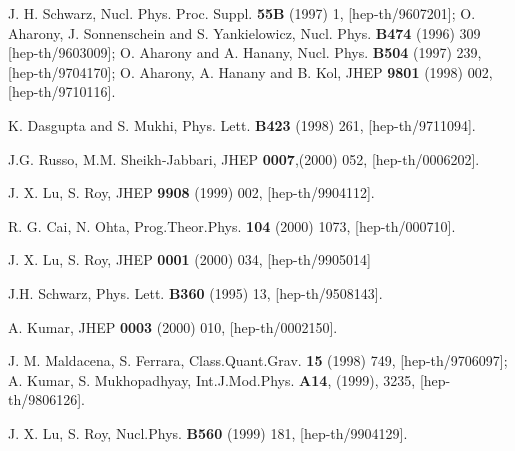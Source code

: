 \documentclass[a4paper,12pt]{article}
\begin{document}
\begin{thebibliography}{99}
 J. H. Schwarz, Nucl. Phys. Proc. Suppl. {\bf 55B} (1997)
1, [hep-th/9607201]; O. Aharony, J. Sonnenschein and S. Yankielowicz, 
Nucl. Phys. {\bf B474} (1996) 309 [hep-th/9603009]; 
O. Aharony and A. Hanany, Nucl. Phys. {\bf B504} (1997) 239,
[hep-th/9704170];
O. Aharony, A. Hanany and B. Kol, JHEP {\bf 9801} (1998) 002,
[hep-th/9710116].

 K. Dasgupta and S. Mukhi, Phys. Lett. {\bf B423} (1998) 
261, [hep-th/9711094]. 

  J.G. Russo, M.M. Sheikh-Jabbari, JHEP {\bf 0007},(2000) 
052, [hep-th/0006202].

 J. X. Lu, S. Roy, JHEP {\bf 9908} (1999) 002,
  [hep-th/9904112].

 R. G. Cai, N. Ohta, Prog.Theor.Phys. {\bf 104} (2000)
 1073, [hep-th/000710]. 

 J. X. Lu, S. Roy, JHEP {\bf 0001} (2000) 034, [hep-th/9905014]


 J.H. Schwarz, Phys. Lett. {\bf B360} (1995) 13, 
[hep-th/9508143].

 A. Kumar, JHEP {\bf 0003} (2000) 010, [hep-th/0002150]. 

 J. M. Maldacena,
  S. Ferrara, Class.Quant.Grav. {\bf 15} (1998) 749, [hep-th/9706097];
A. Kumar, S. Mukhopadhyay, Int.J.Mod.Phys. {\bf A14}, 
(1999), 3235, [hep-th/9806126].

 J. X. Lu, S. Roy, Nucl.Phys. {\bf B560} (1999) 181, 
[hep-th/9904129].
 

 

     


\end{thebibliography}

\end{document}
